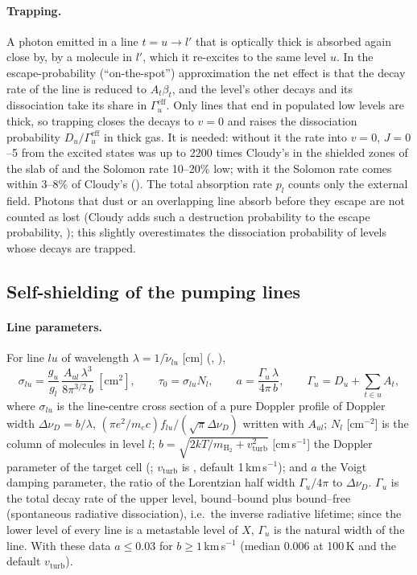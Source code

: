 \paragraph{Trapping.} A photon emitted in a line $t=u\to l'$ that is optically
thick is absorbed again close by, by a molecule in $l'$, which it re-excites
to the same level $u$. In the escape-probability (``on-the-spot'')
approximation the net effect is that the decay rate of the line is reduced to
$A_t\beta_t$, and the level's other decays and its dissociation take its share
in $\Gamma^{\mathrm{eff}}_u$. Only lines that end in populated low levels are
thick, so trapping closes the decays to $v=0$ and raises the dissociation
probability $D_u/\Gamma^{\mathrm{eff}}_u$ in thick gas. It is needed: without it
the rate into $v=0$, $J=0$--5 from the excited states was up to 2200 times
Cloudy's in the shielded zones of the slab of  and the Solomon rate
10--20\% low; with it the Solomon rate comes within 3--8\% of Cloudy's
(). The total absorption rate $p_l$ counts only the external field.
Photons that dust or an overlapping \Htwo{} line absorb before they escape are
not counted as lost (Cloudy adds such a destruction probability to the escape
probability, \citealt{Shaw2005}); this slightly overestimates the dissociation
probability of levels whose decays are trapped.

\subsection{Self-shielding of the pumping lines}
\label{sec:shield}

\paragraph{Line parameters.} For line $lu$ of wavelength $\lambda=1/\tilde\nu_{lu}$
[cm] (, ),
\begin{equation}
  \sigma_{lu} = \frac{g_u}{g_l}\,\frac{A_{ul}\,\lambda^3}{8\pi^{3/2}\,b}\ [\mathrm{cm^2}],\qquad
  \tau_0 = \sigma_{lu}N_l,\qquad
  a = \frac{\Gamma_u\,\lambda}{4\pi\,b},\qquad
  \Gamma_u = D_u + \sum_{t\in u}A_t ,
  \label{eq:lineparams}
\end{equation}
where $\sigma_{lu}$ is the line-centre cross section of a pure Doppler profile
of Doppler width $\Delta\nu_D=b/\lambda$, $(\pi e^2/m_ec)f_{lu}/(\sqrt\pi\Delta\nu_D)$
written with $A_{ul}$; $N_l$ [cm$^{-2}$] is the column of molecules in level $l$;
$b=\sqrt{2kT/m_{\mathrm{H_2}}+v_{\mathrm{turb}}^2}$ [cm\,s$^{-1}$] the Doppler parameter of
the target cell (; $v_{\mathrm{turb}}$ is ,
default 1\,km\,s$^{-1}$); and $a$ the Voigt damping parameter, the ratio of the
Lorentzian half width $\Gamma_u/4\pi$ to $\Delta\nu_D$. $\Gamma_u$ is the total
decay rate of the upper level, bound--bound plus bound--free (spontaneous
radiative dissociation), i.e.\ the inverse radiative lifetime; since the lower
level of every line is a metastable level of $X$, $\Gamma_u$ is the natural width
of the line. With these data $a\le0.03$ for $b\ge1$\,km\,s$^{-1}$ (median 0.006 at
100\,K and the default $v_{\mathrm{turb}}$).

